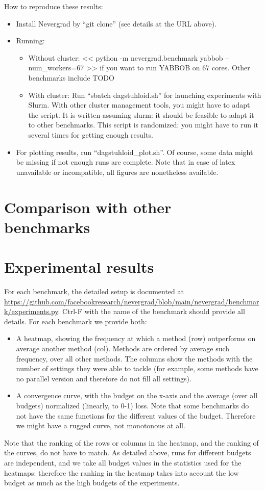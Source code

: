 \documentclass{article}
\begin{document}
How to reproduce these results:
\begin{itemize}
\item Install Nevergrad by “git clone” (see details at the URL above).
\item  Running:
\begin{itemize}
\item Without cluster: << python -m nevergrad.benchmark yabbob --num_workers=67 >> if you want to run YABBOB on 67 cores. Other benchmarks include TODO
\item With cluster: Run “sbatch dagstuhloid.sh” for launching experiments with Slurm. With other cluster management tools, you might have to adapt the script. It is written assuming slurm: it should be feasible to adapt it to other benchmarks. This script is randomized: you might have to run it several times for getting enough results.
\end{itemize}
\item For plotting results, run “dagstuhloid\_plot.sh”. Of course, some data might be missing if not enough runs are complete. Note that in case of latex unavailable or incompatible, all figures are nonetheless available.
\end{itemize}

\section{Comparison with other benchmarks}

\section{Experimental results}

For each benchmark, the detailed setup is documented at \url{https://github.com/facebookresearch/nevergrad/blob/main/nevergrad/benchmark/experiments.py}.
Ctrl-F with the name of the benchmark should provide all details.
For each benchmark we provide both:
\begin{itemize}
\item A heatmap, showing the frequency at which a method (row) outperforms on average another method (col). Methods are ordered by average such frequency, over all other methods.
The columns show the methods with the number of settings they were able to tackle (for example, some methods have no parallel version and therefore do not fill all settings).
\item A convergence curve, with the budget on the x-axis and the average (over all budgets) normalized (linearly, to 0-1) loss. Note that some benchmarks do not have the same functions for the different values of the budget. Therefore we might have a rugged curve, not monotonous at all. 
\end{itemize}
Note that the ranking of the rows or columns in the heatmap, and the ranking of the curves, do not have to match. As detailed above, runs for different budgets are independent, and we take all budget values in the statistics used for the heatmaps: therefore the ranking in the heatmap takes into account the low budget as much as the high budgets of the experiments.
\end{document}
